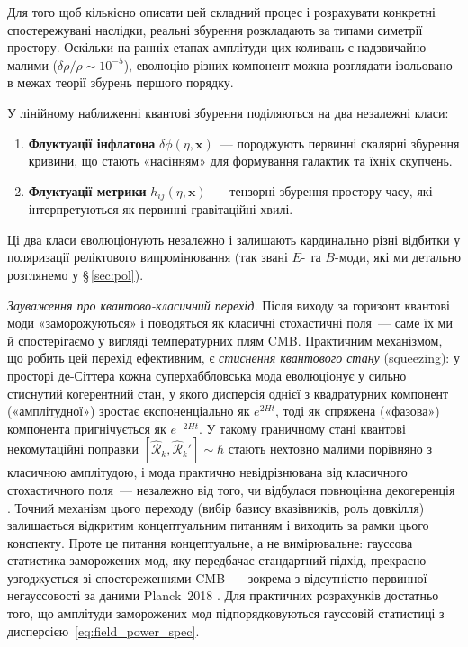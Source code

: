 Для того щоб кількісно описати цей складний процес і розрахувати конкретні спостережувані
наслідки, реальні збурення розкладають за типами симетрії простору. Оскільки на ранніх
етапах амплітуди цих коливань є надзвичайно малими ($\delta\rho/\rho \sim 10^{-5}$), еволюцію
різних компонент можна розглядати ізольовано в межах теорії збурень першого порядку.

У лінійному наближенні квантові збурення поділяються на два незалежні класи:
\begin{enumerate}
  \item \textbf{Флуктуації інфлатона} $\delta\phi(\eta, \mathbf{x})$~---
        породжують первинні скалярні збурення кривини, що стають
        «насінням» для формування галактик та їхніх скупчень.
  \item \textbf{Флуктуації метрики} $h_{ij}(\eta, \mathbf{x})$~---
        тензорні збурення простору-часу, які інтерпретуються як первинні
        гравітаційні хвилі.
\end{enumerate}
Ці два класи еволюціонують незалежно і залишають кардинально різні відбитки
у поляризації реліктового випромінювання (так звані $E$- та $B$-моди, які ми детально розглянемо у §\,\ref{sec:pol}).


\textit{Зауваження про квантово-класичний перехід.}
Після виходу за горизонт квантові моди «заморожуються» і
поводяться як класичні стохастичні поля~--- саме їх ми й
спостерігаємо у вигляді температурних плям CMB. Практичним
механізмом, що робить цей перехід ефективним, є \emph{стиснення
квантового стану} (squeezing): у просторі де-Сіттера кожна
суперхаббловська мода еволюціонує у сильно стиснутий когерентний
стан, у якого дисперсія однієї з квадратурних компонент
(«амплітудної») зростає експоненціально як $e^{2Ht}$, тоді як
спряжена («фазова») компонента пригнічується як $e^{-2Ht}$.
У такому граничному стані квантові некомутаційні поправки
$[\hat{\mathcal{R}}_k, \hat{\mathcal{R}}_k'] \sim \hbar$ стають
нехтовно малими порівняно з класичною амплітудою, і мода
практично невідрізнювана від класичного стохастичного поля~---
незалежно від того, чи відбулася повноцінна декогеренція
\cite{polarski_starobinsky_1996, kiefer_polarski_1998}.
Точний механізм цього переходу (вибір базису вказівників,
роль довкілля) залишається відкритим концептуальним питанням
і виходить за рамки цього конспекту. Проте це питання
концептуальне, а не вимірювальне: гауссова статистика заморожених
мод, яку передбачає стандартний підхід, прекрасно узгоджується зі
спостереженнями CMB~--- зокрема з відсутністю первинної
негауссовості за даними Planck~2018 \cite{planck_2018}.
Для практичних розрахунків достатньо того, що амплітуди
заморожених мод підпорядковуються гауссовій статистиці з
дисперсією~\eqref{eq:field_power_spec}.

